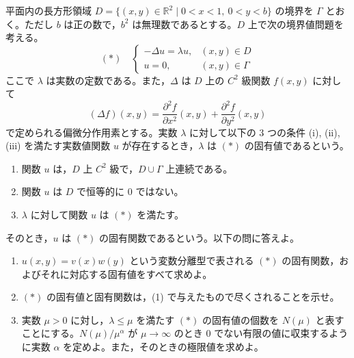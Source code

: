 \documentclass[12pt]{jlreq}
\begin{document}
平面内の長方形領域 $D = \{ (x,y) \in \mathbb{R}^2 \mid 0 < x < 1,\ 0 < y < b \}$ の境界を $\Gamma$ とおく。ただし $b$ は正の数で，$b^2$ は無理数であるとする。$D$ 上で次の境界値問題を考える。
\[
  (*) \quad \begin{cases} -\Delta u = \lambda u, & (x,y) \in D \\ u = 0, & (x,y) \in \Gamma \end{cases}
\]
ここで $\lambda$ は実数の定数である。また，$\Delta$ は $D$ 上の $C^2$ 級関数 $f(x,y)$ に対して
\[
  (\Delta f)(x,y) = \frac{\partial^2 f}{\partial x^2}(x,y) + \frac{\partial^2 f}{\partial y^2}(x,y)
\]
で定められる偏微分作用素とする。実数 $\lambda$ に対して以下の $3$ つの条件 (i), (ii), (iii) を満たす実数値関数 $u$ が存在するとき，$\lambda$ は $(*)$ の固有値であるという。
\begin{enumerate}
  \item[(i)] 関数 $u$ は，$D$ 上 $C^2$ 級で，$D \cup \Gamma$ 上連続である。
  \item[(ii)] 関数 $u$ は $D$ で恒等的に $0$ ではない。
  \item[(iii)] $\lambda$ に対して関数 $u$ は $(*)$ を満たす。
\end{enumerate}
そのとき，$u$ は $(*)$ の固有関数であるという。以下の問に答えよ。

\begin{enumerate}
  \item $u(x,y) = v(x)w(y)$ という変数分離型で表される $(*)$ の固有関数，およびそれに対応する固有値をすべて求めよ。
  \item $(*)$ の固有値と固有関数は，(1) で与えたもので尽くされることを示せ。
  \item 実数 $\mu > 0$ に対し，$\lambda \le \mu$ を満たす $(*)$ の固有値の個数を $N(\mu)$ と表すことにする。$N(\mu)/\mu^\alpha$ が $\mu \to \infty$ のとき $0$ でない有限の値に収束するように実数 $\alpha$ を定めよ。また，そのときの極限値を求めよ。
\end{enumerate}
\end{document}
